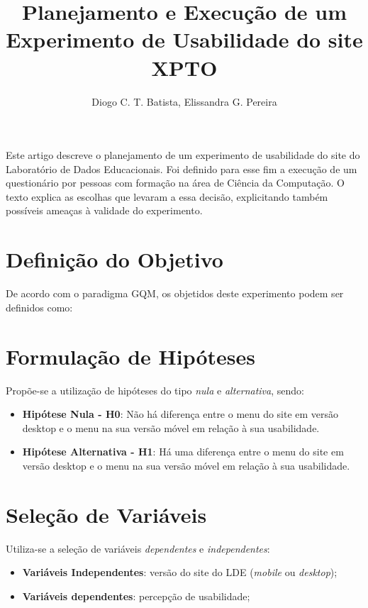 \documentclass[12pt]{article}
\title{Planejamento e Execução de um Experimento de Usabilidade do site XPTO}
\author{Diogo C. T. Batista\inst{1}, Elissandra G. Pereira\inst{1}}
\begin{document}
\maketitle

\begin{resumo}
  Este artigo descreve o planejamento de um experimento de usabilidade do site do Laboratório de Dados Educacionais. Foi definido para esse fim a execução de um questionário por pessoas com formação na área de Ciência da Computação. O texto explica as escolhas que levaram a essa decisão, explicitando também possíveis ameaças à validade do experimento.
\end{resumo}

\section{Definição do Objetivo}

De acordo com o paradigma GQM, os objetidos deste experimento podem ser definidos como:


\section{Formulação de Hipóteses}

Propõe-se a utilização de hipóteses do tipo \textit{nula} e \textit{alternativa}, sendo:

\begin{itemize}
	\item \textbf{Hipótese Nula - H0}: Não há diferença entre o menu do site em versão desktop e o menu na sua versão móvel em relação à sua usabilidade.
	\item \textbf{Hipótese Alternativa - H1}: Há uma diferença entre o menu do site em versão desktop e o menu na sua versão móvel em relação à sua usabilidade.
\end{itemize}

\section{Seleção de Variáveis}

Utiliza-se a seleção de variáveis \textit{dependentes} e \textit{independentes}:

\begin{itemize}
	\item \textbf{Variáveis Independentes}: versão do site do LDE (\textit{mobile} ou \textit{desktop});
	\item \textbf{Variáveis dependentes}: percepção de usabilidade;
\end{itemize}
\end{document}

